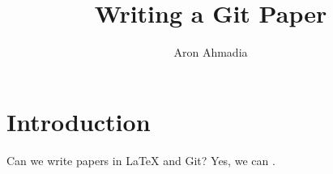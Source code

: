 \documentclass[12pt]{article}
\author{Aron Ahmadia} \title{Writing a Git Paper}
\begin{document}
\maketitle

\section{Introduction}

Can we write papers in LaTeX and Git? Yes, we can \cite{Kees_Akkerman_etal_11}.



\end{document}
